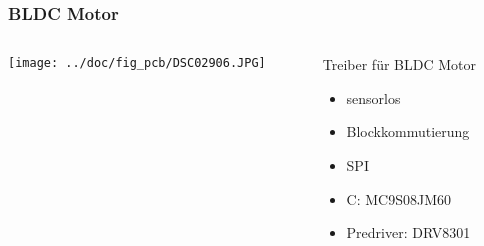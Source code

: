 \begin{frame}
    \frametitle{BLDC Motor}
    \begin{columns}
        \begin{column}{0.50\textwidth}
            \centering
            \texttt{[image: ../doc/fig\_pcb/DSC02906.JPG]}
        \end{column}
        \begin{column}{0.50\textwidth}
            \begin{block}{Treiber für BLDC Motor}
                \begin{itemize}
                    \item sensorlos
                    \item Blockkommutierung
                    \item SPI
                    \item \si{\micro}C: MC9S08JM60
                    \item Predriver: DRV8301
                \end{itemize}
            \end{block}
        \end{column}
    \end{columns}
\end{frame}
